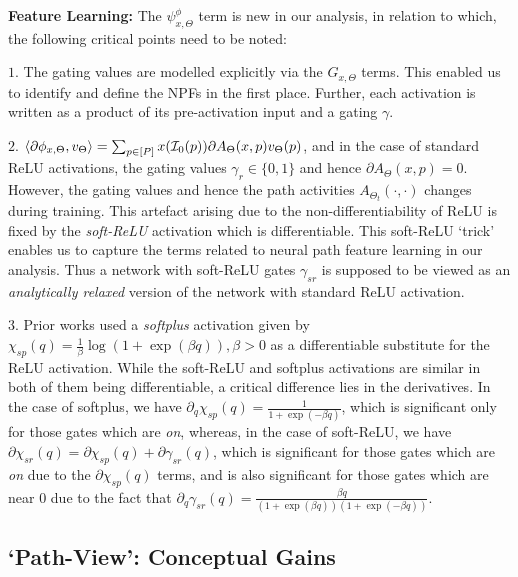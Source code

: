 \textbf{Feature Learning:}  The $\psi^{\phi}_{x,\Theta}$ term is new in our analysis,  in relation to which, the following critical points need to be noted:

$1.$ The gating values are modelled explicitly via the $G_{x,\Theta}$ terms. This enabled us to identify and define the NPFs in the first place. Further, each activation is written as a product of its pre-activation input and a gating $\gamma$.

$2.$ $\langle \partial\phi_{x,\Theta},v_{\Theta}\rangle=\sum_{p\in [P]}x(\mathcal{I}_0(p)) \partial A_{\Theta}(x,p)v_{\Theta}(p)$, and in the case of standard ReLU activations, the gating values $\gamma_r\in\{0,1\}$ and hence $\partial A_{\Theta}(x,p)=0$. However, the gating values and hence the path activities $A_{\Theta_t}(\cdot,\cdot)$ changes during training. This artefact arising due to the non-differentiability of ReLU is fixed by the \emph{soft-ReLU} activation which is differentiable. This soft-ReLU `trick' enables us to capture the terms related to neural path feature learning in our analysis. Thus a network with soft-ReLU gates $\gamma_{sr}$ is supposed to be viewed as an \emph{analytically relaxed} version of the network with standard ReLU activation.

$3.$ Prior works used a \emph{softplus} activation given by $\chi_{sp}(q)=\frac{1}{\beta}\log(1+\exp(\beta q)),\beta>0$ as a differentiable substitute for the ReLU activation. While the soft-ReLU and softplus activations are similar in both of them being differentiable, a critical difference lies in the derivatives. In the case of softplus, we have $\partial_{q}\chi_{sp}(q)=\frac{1}{1+\exp(-\beta q)}$, which is significant only for those gates which are \emph{on}, whereas, in the case of soft-ReLU, we have $\partial{\chi}_{sr}(q)=\partial{\chi}_{sp}(q)+\partial{\gamma}_{sr}(q)$, which is significant for those gates which are \emph{on} due to the $\partial{\chi}_{sp}(q)$ terms, and is also significant for those gates which are near $0$ due to the fact that $\partial_q{\gamma}_{sr}(q)=\frac{\beta q}{(1+\exp(\beta q))(1+\exp(-\beta q))}$. 

\subsection{`Path-View': Conceptual Gains}\label{sec:cg}

